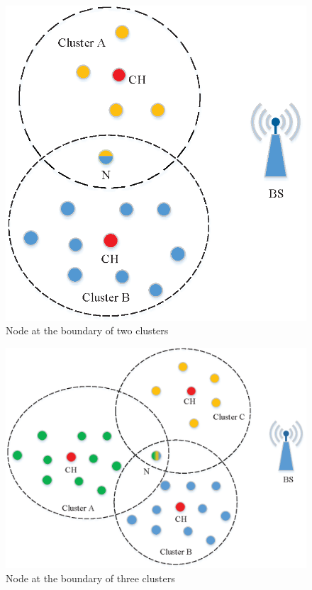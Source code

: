 \documentclass[journal,twoside,web]{ieeecolor}
\begin{document}
\begin{figure}[h!] 
	\centering
	\includegraphics[width=0.7\linewidth]{cha3.eps}
	\caption{Node at the boundary of two clusters}
	\label{fig5}
\end{figure}
\begin{figure}[h!]
	\centering
	\includegraphics[width=0.7\linewidth]{cha2.eps}
	\caption{Node at the boundary of three clusters}
	\label{fig6}
\end{figure}
\end{document}
